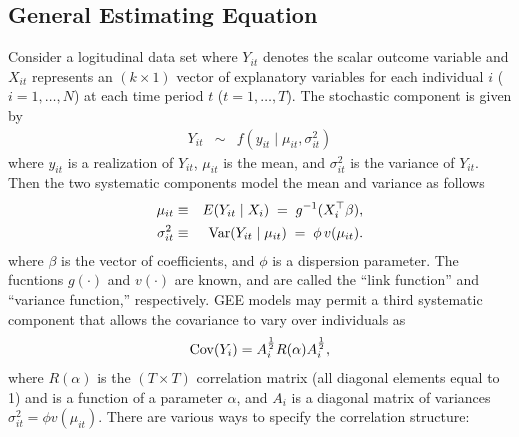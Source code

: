 \subsection{General Estimating Equation}

Consider a logitudinal data set where $Y_{it}$ denotes the scalar
outcome variable and $X_{it}$ represents an $(k \times 1)$ vector of
explanatory variables for each individual $i$ ($i=1,\dots,N$) at each
time period $t$ ($t=1,\dots,T$).  The stochastic component is
given by
\begin{eqnarray*}
  Y_{it} & \sim & f(y_{it}\mid \mu_{it}, \sigma^2_{it})
\end{eqnarray*}
where $y_{it}$ is a realization of $Y_{it}$, $\mu_{it}$ is the mean,
and $\sigma^2_{it}$ is the variance of $Y_{it}$.  Then the two
systematic components model the mean and variance as follows
\begin{eqnarray*}
\mu_{it} & \equiv & E(Y_{it}\mid X_i) \; = \; g^{-1}(X_i^\top \beta), \\
\sigma^2_{it} & \equiv & {\rm Var}(Y_{it}\mid \mu_{it}) \; = \; \phi\, v(\mu_{it}).
\end{eqnarray*}
where $\beta$ is the vector of coefficients, and $\phi$ is a
dispersion parameter.  The fucntions $g(\cdot)$ and $v(\cdot)$ are
known, and are called the ``link function'' and ``variance function,''
respectively.  GEE models may permit a third systematic component that
allows the covariance to vary over individuals as
\begin{eqnarray*}
  {\rm Cov}(Y_i) = A_i^{\frac{1}{2}} R(\alpha) A_i^{\frac{1}{2}},
\end{eqnarray*}
where $R(\alpha)$ is the $(T \times T)$ correlation matrix (all
diagonal elements equal to 1) and is a function of a parameter
$\alpha$, and $A_i$ is a diagonal matrix of variances
$\sigma^2_{it}=\phi v(\mu_{it})$. There are various ways to specify
the correlation structure:
